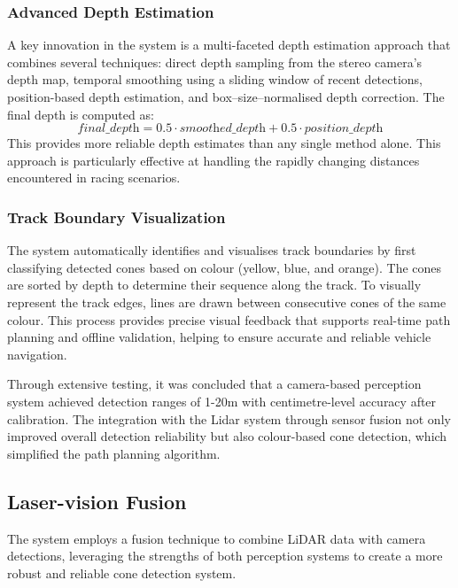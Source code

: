 \documentclass[conference]{IEEEtran}
\begin{document}
\subsubsection{Advanced Depth Estimation}
A key innovation in the system is a multi-faceted depth estimation approach that combines several techniques: direct depth sampling from the stereo camera's depth map, temporal smoothing using a sliding window of recent detections, position-based depth estimation, and box–size–normalised depth correction. The final depth is computed as:
\[
\textit{final\_depth} = 0.5 \cdot \textit{smoothed\_depth} + 0.5 \cdot \textit{position\_depth}
\]
This provides more reliable depth estimates than any single method alone. This approach is particularly effective at handling the rapidly changing distances encountered in racing scenarios.

\subsubsection{Track Boundary Visualization}
The system automatically identifies and visualises track boundaries by first classifying detected cones based on colour (yellow, blue, and orange). The cones are sorted by depth to determine their sequence along the track. To visually represent the track edges, lines are drawn between consecutive cones of the same colour. This process provides precise visual feedback that supports real-time path planning and offline validation, helping to ensure accurate and reliable vehicle navigation.

\vspace{0.4em}
Through extensive testing, it was concluded that a camera-based perception system achieved detection ranges of 1-20m with centimetre-level accuracy after calibration. The integration with the Lidar system through sensor fusion not only improved overall detection reliability but also colour-based cone detection, which simplified the path planning algorithm.

\subsection{Laser-vision Fusion}\vspace{-0.4em}
The system employs a fusion technique to combine LiDAR data with camera detections, leveraging the strengths of both perception systems to create a more robust and reliable cone detection system.
\end{document}
